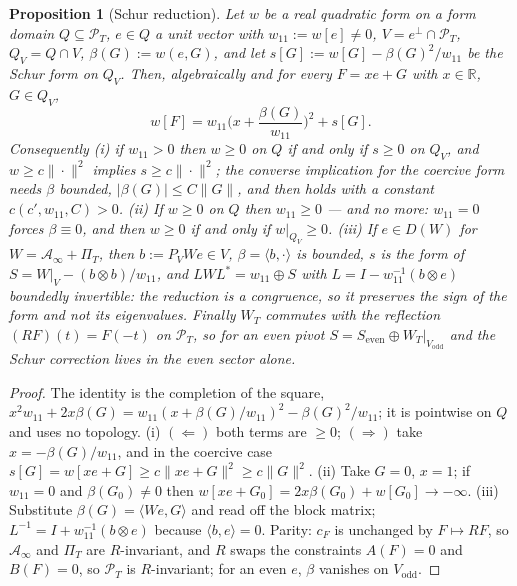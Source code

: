 \documentclass[11pt]{amsart}
\newtheorem{proposition}[theorem]{Proposition}
\theoremstyle{definition}
\theoremstyle{remark}
\newcommand{\R}{\mathbb R}
\newcommand{\PT}{\mathcal P_T}
\newcommand{\cF}{c_F}
\newcommand{\Ainf}{\mathcal A_\infty}
\newcommand{\PiT}{\Pi_T}
\begin{document}
\begin{proposition}[Schur reduction]\label{prop:schur}
Let $w$ be a real quadratic form on a form domain $Q\subseteq\PT$, $e\in Q$ a unit vector with
$w_{11}:=w[e]\ne0$, $V=e^\perp\cap\PT$, $Q_V=Q\cap V$, $\beta(G):=w(e,G)$, and let
$s[G]:=w[G]-\beta(G)^2/w_{11}$ be the Schur form on $Q_V$. Then, algebraically and for every
$F=xe+G$ with $x\in\R$, $G\in Q_V$,
\[
w[F]=w_{11}\Big(x+\frac{\beta(G)}{w_{11}}\Big)^2+s[G].
\]
Consequently \emph{(i)} if $w_{11}>0$ then $w\ge0$ on $Q$ if and only if $s\ge0$ on $Q_V$, and
$w\ge c\|\cdot\|^2$ implies $s\ge c\|\cdot\|^2$; the converse implication for the coercive form needs
$\beta$ bounded, $|\beta(G)|\le C\|G\|$, and then holds with a constant $c(c',w_{11},C)>0$.
\emph{(ii)} If $w\ge0$ on $Q$ then $w_{11}\ge0$ --- and no more: $w_{11}=0$ forces $\beta\equiv0$, and
then $w\ge0$ if and only if $w|_{Q_V}\ge0$.
\emph{(iii)} If $e\in D(W)$ for $W=\Ainf+\PiT$, then $b:=P_VWe\in V$, $\beta=\langle b,\cdot\rangle$
is bounded, $s$ is the form of $S=W|_V-(b\otimes b)/w_{11}$, and
$LWL^*=w_{11}\oplus S$ with $L=I-w_{11}^{-1}(b\otimes e)$ boundedly invertible: the reduction is a
congruence, so it preserves the sign of the form and not its eigenvalues.
Finally $W_T$ commutes with the reflection $(RF)(t)=F(-t)$ on $\PT$, so for an even pivot
$S=S_{\mathrm{even}}\oplus W_T|_{V_{\mathrm{odd}}}$ and the Schur correction lives in the even sector
alone.
\end{proposition}
\begin{proof}
The identity is the completion of the square, $x^2w_{11}+2x\beta(G)=w_{11}(x+\beta(G)/w_{11})^2-\beta(G)^2/w_{11}$;
it is pointwise on $Q$ and uses no topology. (i) $(\Leftarrow)$ both terms are $\ge0$;
$(\Rightarrow)$ take $x=-\beta(G)/w_{11}$, and in the coercive case
$s[G]=w[xe+G]\ge c\|xe+G\|^2\ge c\|G\|^2$. (ii) Take $G=0$, $x=1$; if $w_{11}=0$ and
$\beta(G_0)\ne0$ then $w[xe+G_0]=2x\beta(G_0)+w[G_0]\to-\infty$. (iii) Substitute
$\beta(G)=\langle We,G\rangle$ and read off the block matrix; $L^{-1}=I+w_{11}^{-1}(b\otimes e)$
because $\langle b,e\rangle=0$. Parity: $\cF$ is unchanged by $F\mapsto RF$, so $\Ainf$ and $\PiT$
are $R$-invariant, and $R$ swaps the constraints $A(F)=0$ and $B(F)=0$, so $\PT$ is $R$-invariant;
for an even $e$, $\beta$ vanishes on $V_{\mathrm{odd}}$.
\end{proof}
\end{document}
